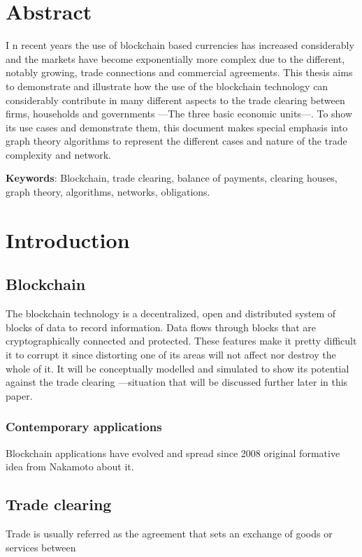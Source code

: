 \documentclass[12pt]{article}
\begin{document}
\begin{multicols}{2}
\section*{Abstract}

\lettrine[lines=2]{I}{ }n recent years the use of blockchain based currencies has increased considerably and the markets have become exponentially more complex due to the different, notably growing, trade connections and commercial agreements. This thesis aims to demonstrate and illustrate how the use of the blockchain technology can considerably contribute in many different aspects to the trade clearing between firms, households and governments ---The three basic economic units---. To show its use cases and demonstrate them, this document makes special emphasis into graph theory algorithms to represent the different cases and nature of the trade complexity and network.


\textbf{Keywords}: Blockchain, trade clearing, balance of payments, clearing houses, graph theory, algorithms, networks, obligations.

\section{Introduction}
\subsection{Blockchain} The blockchain technology is a decentralized, open and distributed system of blocks of data to record information. Data flows through blocks that are cryptographically connected and protected. These features make it pretty difficult it to corrupt it since distorting one of its areas will not affect nor destroy the whole of it. \cite{yaga2019blockchain}
It will be conceptually modelled and simulated to show its potential against the trade clearing ---situation that will be discussed further later in this paper.
\subsubsection{Contemporary applications} 
Blockchain applications have evolved and spread since 2008 original formative idea from Nakamoto about it. \cite{kane2017blockchain}
\subsection{Trade clearing} Trade is usually referred as the agreement that sets an exchange of goods or services between 


\end{multicols}
\end{document}
